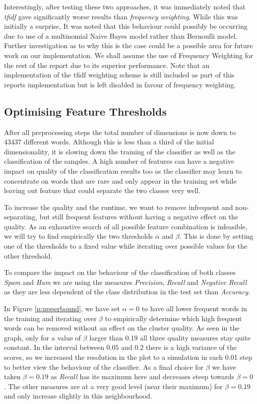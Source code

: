 Interestingly, after testing these two approaches, it was immediately noted that \emph{tfidf} gave significantly worse results than \emph{frequency weighting}. While this was initially a surprise, It was noted that this behaviour could possibly be occurring due to use of a multinomial Naive Bayes model rather than Bernoulli model. Further investigation as to why this is the case could be a possible area for future work on our implementation. We shall assume the use of Frequency Weighting for the rest of the report due to its superior performance. Note that an implementation of the tfidf weighting scheme is still included as part of this reports implementation but is left disabled in favour of frequency weighting.

\subsection{Optimising Feature Thresholds}
\label{sec:featurethresholds}

After all preprocessing steps the total number of dimensions is now down to 43437 different words.
Although this is less than a third of the initial dimensionality, it is slowing down the training of the classifier as well as the classification of the samples.
A high number of features can have a negative impact on quality of the classification results too as the classifier may learn to concentrate on words that are rare and only appear in the training set while leaving out feature that could separate the two classes very well.

To increase the quality and the runtime, we want to remove infrequent and non-separating, but still frequent features without having a negative effect on the quality.
As an exhaustive search of all possible feature combination is infeasible, we will try to find empirically the two thresholds $\alpha$ and $\beta$.
This is done by setting one of the thresholds to a fixed value while iterating over possible values for the other threshold.



To compare the impact on the behaviour of the classification of both classes \emph{Spam} and \emph{Ham} we are using the measures \emph{Precision}, \emph{Recall} and \emph{Negative Recall} as they are less dependent of the class distribution in the test set than \emph{Accuracy}.

In Figure \ref{p:upperbound}, we have set $\alpha = 0$ to have all lower frequent words in the training and iterating over $\beta$ to empirically determine which high frequent words can be removed without an effect on the cluster quality.
As seen in the graph, only for a value of $\beta$ larger than 0.19 all three quality measures stay quite constant.
In the interval between $0.05$ and $0.2$ there is a high variance of the scores, so we increased the resolution in the plot to a simulation in each 0.01 step to better view the behaviour of the classifier.
As a final choice for $\beta$ we have taken $\beta = 0.19$ as \emph{Recall} has its maximum here and decreases steep towards $\beta = 0$.
The other measures are at a very good level (near their maximum) for $\beta = 0.19$ and only increase slightly in this neighbourhood.


